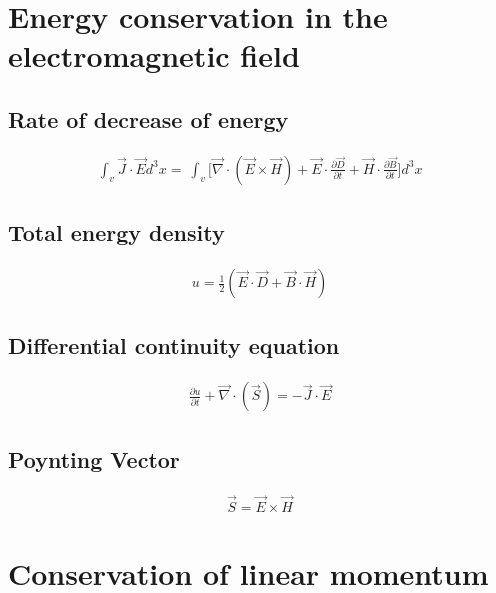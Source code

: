 \documentclass[a4paper, 11pt, landscape]{article}
\begin{document}
\begin{multicols*}{3}
\section{Energy conservation in the electromagnetic field}
\subsection{Rate of decrease of energy}
\begin{compactenum}
    \begin{align*}
        \int_{v} \vec{J} \cdot \vec{E} d^{3} x = \ \int_{v}\Bigg[\vec{\nabla} \cdot (\vec{E} \times \vec{H}) + \vec{E} \cdot \frac{\partial \vec{D}}{\partial t} + \vec{H} \cdot \frac{\partial \vec{B}}{\partial t} \Bigg] d^{3}x
    \end{align*}
\end{compactenum}

\subsection{Total energy density}
\begin{compactenum}
    \begin{align*}
    u = \frac{1}{2}(\vec{E} \cdot \vec{D} + \vec{B} \cdot \vec{H})
    \end{align*}
\end{compactenum}

\subsection{Differential continuity equation}
\begin{compactenum}
    \begin{align*}
    \frac{\partial u}{\partial t} + \vec{\nabla} \cdot (\vec{S}) = - \vec{J} \cdot \vec{E}
    \end{align*}
\end{compactenum}

\subsection{Poynting Vector}
\begin{compactenum}
    \begin{align*}
   \vec{S} = \vec{E} \times \vec{H}
    \end{align*}
\end{compactenum}

\section{Conservation of linear momentum}

\end{multicols*}
\end{document}
